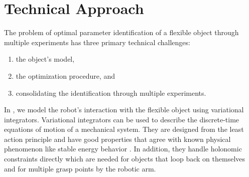\documentclass[runningheads,a4paper]{llncs}
\begin{document}


\section{Technical Approach}
\label{sec-tech}
The problem of optimal parameter identification of a flexible object through multiple experiments has three primary technical challenges:
\begin{enumerate}
\item the object's model,
\item the optimization procedure, and 
\item consolidating the identification through multiple experiments.
\end{enumerate}

In \cite{caldwell_coleman_correll}, we model the robot's interaction with the flexible object using variational integrators.  Variational integrators can be used to describe the discrete-time equations of motion of a mechanical system.  They are designed from the least action principle and have good properties that agree with known physical phenomenon like stable energy behavior \cite{pekarek_murphey}.  In addition, they handle holonomic constraints directly which are needed for objects that loop back on themselves and for multiple grasp points by the robotic arm. 
\end{document}
